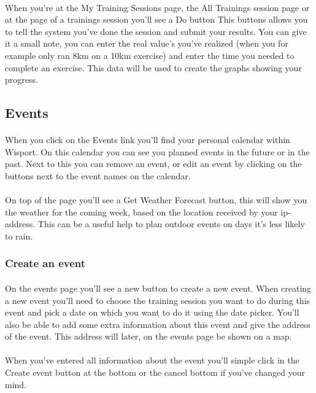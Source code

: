 \documentclass[11pt,a4paper]{scrartcl}
\begin{document}
\paragraph{}When you're at the My Training Sessions page, the All Trainings session page or at the page of a trainings session you'll see a Do button This buttons allows you to tell the system you've done the session and submit your results. You can give it a small note, you can enter the real value's you've realized (when you for example only ran 8km on a 10km exercise) and enter the time you needed to complete an exercise. This data will be used to create the graphs showing your progress.

\subsection{Events} 
\paragraph{}When you click on the Events link you'll find your personal calendar within Wisport. On this calendar you can see you planned events in the future or in the past. Next to this you can remove an event, or edit an event by clicking on the buttons next to the event names on the calendar.
\paragraph{}On top of the page you'll see a Get Weather Forecast button, this will show you the weather for the coming week, based on the location received by your ip-address. This can be a useful help to plan outdoor events on days it's less likely to rain.
\subsubsection{Create an event}
\paragraph{}On the events page you'll see a new button to create a new event. When creating a new event you'll need to choose the training session you want to do during this event and pick a date on which you want to do it using the date picker. You'll also be able to add some extra information about this event and give the address of the event. This address will later, on the events page be shown on a map.
\paragraph{}When you've entered all information about the event you'll simple click in the Create event button at the bottom or the cancel bottom if you've changed your mind.
\end{document}
